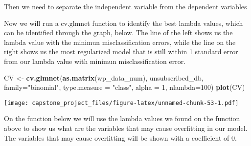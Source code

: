 \documentclass[]{article}
\newenvironment{Shaded}{\begin{snugshade}}{\end{snugshade}}
\newcommand{\KeywordTok}[1]{\textcolor[rgb]{0.13,0.29,0.53}{\textbf{#1}}}
\newcommand{\DataTypeTok}[1]{\textcolor[rgb]{0.13,0.29,0.53}{#1}}
\newcommand{\DecValTok}[1]{\textcolor[rgb]{0.00,0.00,0.81}{#1}}
\newcommand{\StringTok}[1]{\textcolor[rgb]{0.31,0.60,0.02}{#1}}
\newcommand{\OperatorTok}[1]{\textcolor[rgb]{0.81,0.36,0.00}{\textbf{#1}}}
\newcommand{\NormalTok}[1]{#1}
\begin{document}
Then we need to separate the independent variable from the dependent
variables

\begin{Shaded}
\end{Shaded}

Now we will run a cv.glmnet function to identify the best lambda values,
which can be identified through the graph, below. The line of the left
shows us the lambda value with the minimun misclassification errors,
while the line on the right shows us the most regularized model that is
still within 1 standard error from our lambda value with minimun
misclassification error.

\begin{Shaded}
\begin{Highlighting}[]
\NormalTok{CV <-}\StringTok{ }\KeywordTok{cv.glmnet}\NormalTok{(}\KeywordTok{as.matrix}\NormalTok{(wp_data_num), unsubscribed_db, }\DataTypeTok{family=}\StringTok{"binomial"}\NormalTok{, }\DataTypeTok{type.measure =} \StringTok{"class"}\NormalTok{, }\DataTypeTok{alpha =} \DecValTok{1}\NormalTok{, }\DataTypeTok{nlambda=}\DecValTok{100}\NormalTok{)}
\KeywordTok{plot}\NormalTok{(CV)}
\end{Highlighting}
\end{Shaded}

\texttt{[image: capstone\_project\_files/figure-latex/unnamed-chunk-53-1.pdf]}

On the function below we will use the lambda values we found on the
function above to show us what are the variables that may cause
overfitting in our model. The variables that may cause overfitting will
be shown with a coefficient of 0.

\begin{Shaded}
\end{Shaded}
\end{document}
